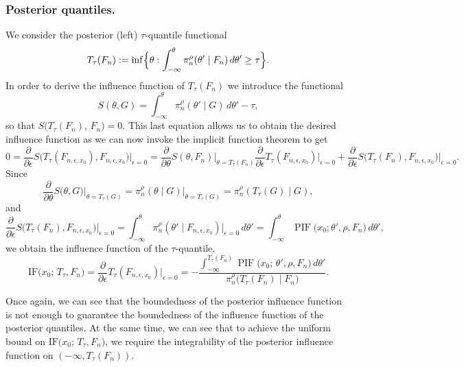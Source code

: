 \documentclass[11pt, oneside]{amsart}
\theoremstyle{definition}   %
\newcommand{\PIF}{\operatorname{PIF}}
\newcommand{\loss}{\rho}
\newcommand{\mposterior}{\pi_n^{\loss}}
\begin{document}
\subsubsection{Posterior quantiles.}

We consider the posterior (left) $\tau$-quantile functional 
%
\begin{equation}
\label{eqn::definiton-posterior-quantiles}
    T_\tau(F_n)
    :=
    \inf \Bigl \{ \theta : \int_{-\infty}^{\theta} \mposterior (\theta' \mid F_n)\, d\theta' \geq \tau\Bigr\}.
\end{equation}
%
In order to derive the influence function of $T_\tau(F_n)$ we introduce the functional
%
\[
    S(\theta, G)
    =
    \int_{-\infty}^{\theta}\mposterior(\theta'\mid G)\,d \theta'
    -
    \tau,
\]
%
so that \( S \bigl(T_\tau(F_n),\,F_n\bigr) = 0\). This last equation allows us to obtain the desired influence function as we can now invoke the implicit function theorem to get 
%
\[
    0
    =
    \frac{\partial}{\partial\epsilon}
     S\!\bigl(T_\tau(F_{n,\epsilon,x_0}),F_{n,\epsilon,x_0}\bigr)\Big|_{\epsilon=0}
    \!
    =
    \frac{\partial}{\partial\theta}S(\theta,F_n)\Big|_{\theta=T_\tau(F_n)}
     \frac{\partial}{\partial\epsilon}T_\tau(F_{n,\epsilon,x_0})\Big|_{\epsilon=0} \!
    + \! \frac{\partial}{\partial\epsilon}S\!\bigl(T_\tau(F_n),F_{n,\epsilon,x_0}\bigr)\Big|_{\epsilon=0}.
\]
%
Since
\[
    \frac{\partial}{\partial \theta} S\bigl(\theta,G\bigr)\Big |_{\theta = T_\tau(G)}
    =
    \mposterior(\theta\mid G)\Big |_{\theta = T_\tau(G)}  =
    \mposterior(T_\tau(G)\mid G),
\]
%
and
%
\[
    \frac{\partial}{\partial \epsilon} S\bigl(T_\tau(F_n),F_{n,\epsilon,x_0} \bigr) \Big |_{\epsilon = 0}
    =
    \int_{-\infty}^{\theta}\mposterior(\theta'\mid F_{n,\epsilon,x_0})  \Big |_{\epsilon = 0} \,d \theta'
    =
    \int_{-\infty}^{\theta}
    \PIF\bigl(x_0; \theta', \rho,F_n\bigr)\,d\theta',
\]
%
we obtain the influence function of the \(\tau\)-quantile,
%
\begin{equation}
\label{eqn::influence-function-of-posterior-quantile}
    \mathrm{IF}\bigl(x_0;\,T_\tau,F_n\bigr)
    =
    \frac{\partial}{\partial \epsilon} T_\tau(F_{n,\epsilon,x_0}) \Big \lvert_{\epsilon=0}
    =
    -
    \frac{\displaystyle
      \int_{-\infty}^{T_\tau(F_n)}
        \PIF\bigl(x_0;\, \theta', \rho,F_n\bigr)\,d\theta'
    }{
      \displaystyle \mposterior\bigl(T_\tau(F_n)\mid F_n\bigr)
    }.
\end{equation}

%
Once again, we can see that the boundedness of the posterior influence function is not enough to guarantee the boundedness of the influence function of the posterior quantiles. At the same time, we can see that to achieve the uniform bound on \(\mathrm{IF}\bigl(x_0;\,T_\tau,F_n\bigr)\), we require the integrability of the posterior influence function on \( (-\infty, T_\tau(F_n) )\).
\end{document}
